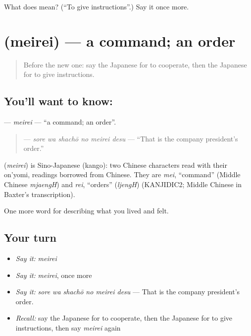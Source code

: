 \begin{tcolorbox}[breakable,colback=teal!4,colframe=teal!35!black,title={Before you move on}]
What does  mean? (\textquotedblleft{}To give instructions\textquotedblright{}.) Say it once more.
\end{tcolorbox}
\section[\texorpdfstring{\ja{めいれい} (meirei)}{めいれい (meirei)}]{ (meirei) — a command; an order}

\label{lesson:JA-C455-meirei}



\begin{quote}
Before the new one: say the Japanese for to cooperate, then the Japanese for to give instructions.
\end{quote}

\subsection*{You'll want to know: }
\textbf{} — \emph{meirei} — \textquotedblleft{}a command; an order\textquotedblright{}.

\begin{quote}
\textbf{  } — \emph{sore wa shachō no meirei desu} — \textquotedblleft{}That is the company president's order.\textquotedblright{}
\end{quote}

\begin{cousinweb}
\textbf{} (\emph{meirei}) is Sino-Japanese (kango): two Chinese characters read with their on'yomi, readings borrowed from Chinese. They are \emph{mei}, \textquotedblleft{}command\textquotedblright{} (Middle Chinese \emph{mjaengH}) and \emph{rei}, \textquotedblleft{}orders\textquotedblright{} (\emph{ljengH}) (KANJIDIC2; Middle Chinese in Baxter's transcription).
\end{cousinweb}

\begin{grammarlens}[title={What you've built}]
One more word for describing what you lived and felt.
\end{grammarlens}

\subsection*{Your turn}
\begin{itemize}
\raggedright
  \item \emph{Say it:} \emph{meirei}
  \item \emph{Say it:} \emph{meirei}, once more
  \item \emph{Say it:} \emph{sore wa shachō no meirei desu} — That is the company president's order.
  \item \emph{Recall:} say the Japanese for to cooperate, then the Japanese for to give instructions, then say \emph{meirei} again
\end{itemize}

